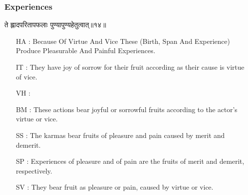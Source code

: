 \begin{frame}[fragile]\frametitle{Experiences}
\begin{sanskrit}
ते ह्लादपरितापफलाः पुण्यापुण्यहेतुत्वात्॥१४॥
\end{sanskrit}

	\begin{itemize}
	\item [HA]: Because Of Virtue And Vice These (Birth, Span And Experience) Produce Pleasurable And Painful Experiences.
	\item [IT]: They have joy of sorrow for their fruit according as their cause is virtue of vice.
	\item [VH]: 
	\item [BM]: These actions bear joyful or sorrowful fruits according to the actor’s virtue or vice.
	\item [SS]: The karmas bear fruits of pleasure and pain caused by merit and demerit.
	\item [SP]: Experiences of pleasure and of pain are the fruits of merit and demerit, respectively.
	\item [SV]: They bear fruit as pleasure or pain, caused by virtue or vice. 
	\end{itemize}
\end{frame}


